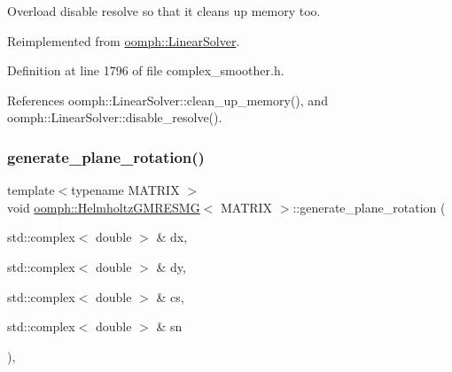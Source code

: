 Overload disable resolve so that it cleans up memory too. 



Reimplemented from \hyperlink{classoomph_1_1LinearSolver_ad61c63af94c5961830bd9807225a48d6}{oomph\+::\+Linear\+Solver}.



Definition at line 1796 of file complex\+\_\+smoother.\+h.



References oomph\+::\+Linear\+Solver\+::clean\+\_\+up\+\_\+memory(), and oomph\+::\+Linear\+Solver\+::disable\+\_\+resolve().

\mbox{\label{classoomph_1_1HelmholtzGMRESMG_afc666c19cb09f252e63e43c3e126fb9a}} 
\subsubsection{\texorpdfstring{generate\+\_\+plane\+\_\+rotation()}{generate\_plane\_rotation()}}
{\footnotesize\ttfamily template$<$typename M\+A\+T\+R\+IX $>$ \\
void \hyperlink{classoomph_1_1HelmholtzGMRESMG}{oomph\+::\+Helmholtz\+G\+M\+R\+E\+S\+MG}$<$ M\+A\+T\+R\+IX $>$\+::generate\+\_\+plane\+\_\+rotation (\begin{DoxyParamCaption}\item[{std\+::complex$<$ double $>$ \&}]{dx,  }\item[{std\+::complex$<$ double $>$ \&}]{dy,  }\item[{std\+::complex$<$ double $>$ \&}]{cs,  }\item[{std\+::complex$<$ double $>$ \&}]{sn }\end{DoxyParamCaption})\hspace{0.3cm}{\ttfamily [inline]}, {\ttfamily [protected]}}



